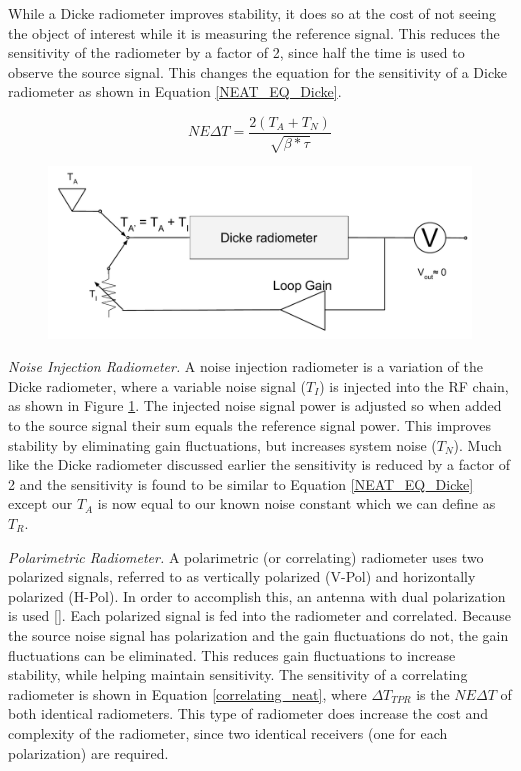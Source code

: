 While a Dicke radiometer improves stability, it does so at the cost of not seeing the object of interest while it is measuring the reference signal.  This reduces the sensitivity of the radiometer by a factor of 2, since half the time is used to observe the source signal.  This changes the equation for the sensitivity of a Dicke radiometer as shown in Equation \ref{NEAT_EQ_Dicke}.

\begin{equation} \label{NEAT_EQ_Dicke}
NE\Delta T=\frac{2(T_{A}+T_{N})}{\sqrt{\beta * \tau}} 
\end{equation}

{\begin{figure}[h!tb] 
\centering
\includegraphics[width=\textwidth]{Images/Noise_inj_radiometer.pdf}
\label{NoiseInj_radiometer}
\end{figure}
}

\emph{Noise Injection Radiometer.}  A noise injection radiometer is a variation of the Dicke radiometer, where a variable noise signal ($T_I$) is injected into the RF chain, as shown in Figure \ref{NoiseInj_radiometer}.  The injected noise signal power is adjusted so when added to the source signal their sum equals the reference signal power.  This improves stability by eliminating gain fluctuations, but increases system noise ($T_N$).  Much like the Dicke radiometer discussed earlier the sensitivity is reduced by a factor of 2 and the sensitivity is found to be similar to Equation \ref{NEAT_EQ_Dicke} except our $T_A$ is now equal to our known noise constant which we can define as $T_R$.

\emph{Polarimetric Radiometer.} A polarimetric (or correlating) radiometer uses two polarized signals, referred to as vertically polarized (V-Pol) and horizontally polarized (H-Pol).  In order to accomplish this, an antenna with dual polarization is used [\cite{Fujimoto}].  Each polarized signal is fed into the radiometer and correlated.  Because the source noise signal has polarization and the gain fluctuations do not, the gain fluctuations can be eliminated.  This reduces gain fluctuations to increase stability, while helping maintain sensitivity.  The sensitivity of a correlating radiometer is shown in Equation \ref{correlating_neat}, where $\Delta T_{TPR}$ is the $NE\Delta T$ of both identical radiometers. This type of radiometer does increase the cost and complexity  of the radiometer, since two identical receivers (one for each polarization) are required. 

